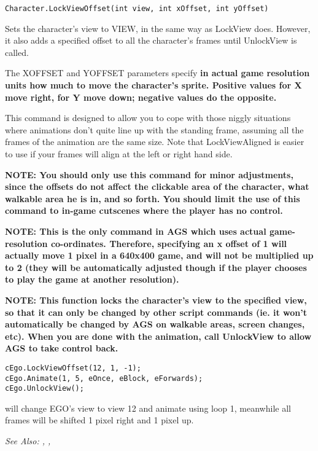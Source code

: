 \begin{verbatim}
Character.LockViewOffset(int view, int xOffset, int yOffset)
\end{verbatim}

Sets the character's view to VIEW, in the same way as LockView does. However,
it also adds a specified offset to all the character's frames until UnlockView
is called.

The XOFFSET and YOFFSET parameters specify \bf{in actual game resolution units} how much
to move the character's sprite. Positive values for X move right, for Y move down; negative
values do the opposite.

This command is designed to allow you to cope with those niggly situations where animations
don't quite line up with the standing frame, assuming all the frames of the animation are
the same size. Note that LockViewAligned is easier to use if your frames will align at
the left or right hand side.

\bf{NOTE:} You should only use this command for minor adjustments, since the offsets do not
affect the clickable area of the character, what walkable area he is in, and so forth. You
should limit the use of this command to in-game cutscenes where the player has no control.

\bf{NOTE:} This is the only command in AGS which uses actual game-resolution co-ordinates.
Therefore, specifying an x offset of 1 will actually move 1 pixel in a 640x400 game, and will
not be multiplied up to 2 (they will be automatically adjusted though if the player chooses
to play the game at another resolution).

\bf{NOTE:} This function locks the character's view to the specified view, so
that it can only be changed by other script commands (ie. it won't
automatically be changed by AGS on walkable areas, screen changes, etc). When
you are done with the animation, call UnlockView to allow AGS to take control back.

\begin{verbatim}
cEgo.LockViewOffset(12, 1, -1);
cEgo.Animate(1, 5, eOnce, eBlock, eForwards);
cEgo.UnlockView();
\end{verbatim}
will change EGO's view to view 12 and animate using loop 1, meanwhile all frames will be
shifted 1 pixel right and 1 pixel up.

\it{See Also:} ,
,


